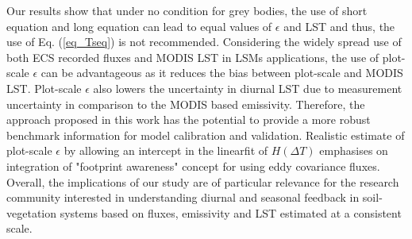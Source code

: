\documentclass[fleqn,10pt]{wlscirep}
\begin{document}
{Our results show that under no condition for grey bodies, the use of short equation and long equation can lead to equal values of $\epsilon$ and LST and thus, the use of Eq. (\ref{eq_Tseq}) is not recommended. Considering the widely spread use of both ECS recorded fluxes and MODIS LST in LSMs applications, the use of plot-scale $\epsilon$ can be advantageous as it reduces the bias between plot-scale and MODIS LST. Plot-scale $\epsilon$ also lowers the uncertainty in diurnal LST due to measurement uncertainty in comparison to the MODIS based emissivity. Therefore, the approach proposed in this work has the potential to provide a more robust benchmark information for model calibration and validation. Realistic estimate of plot-scale $\epsilon$ by allowing an intercept in the linearfit of $H (\Delta T)$ emphasises on integration of "footprint awareness" concept for using eddy covariance fluxes. Overall, the implications of our study are of particular relevance for the research community interested in understanding diurnal and seasonal feedback in soil-vegetation systems based on fluxes, emissivity and LST estimated at a consistent scale.



}
\end{document}
